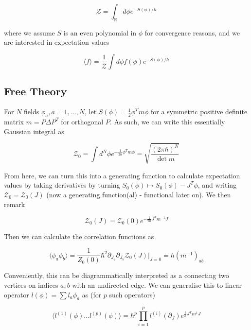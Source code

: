 \documentclass{article}
\theoremstyle{definition}
\begin{document}
\begin{equation}
  \mathcal{Z} = \int_\mathbb{R} d\phi e^{-S(\phi) / \hbar}
\end{equation}

where we assume $S$ is an even polynomial in $\phi$ for convergence reasons, and
we are interested in expectation values

\begin{equation}
  \langle f \rangle = \frac{1}{\mathcal{Z}} \int d\phi f(\phi) e^{-S(\phi) / \hbar}
\end{equation}

\subsection{Free Theory}

For $N$ fields $\phi_a, a = 1, \dots, N$, let $S(\phi) = \frac{1}{2} \phi^T m
\phi$ for a symmetric positive definite matrix $m = P\Delta P^T$ for orthogonal
$P$. As such, we can write this essentially Gaussian integral as

\begin{equation}
  \mathcal{Z}_0 = \int d^N \phi e^{-\frac{1}{2 \hbar} \phi^T m \phi} = \sqrt{\frac{(2\pi\hbar)^N}{\det m}}
\end{equation}

From here, we can turn this into a generating function to calculate expectation
values by taking derivatives by turning $S_0(\phi) \mapsto S_0(\phi) - J^T
\phi$, and writing $\mathcal{Z}_0 = \mathcal{Z}_0(J)$ (now a generating
function(al) - functional later on). We then remark

\begin{equation}
  \mathcal{Z}_0(J) = \mathcal{Z}_0(0) e^{-\frac{1}{2\hbar} J^T m^{-1} J}
\end{equation}

Then we can calculate the correlation functions as

\begin{equation}
  \langle \phi_a \phi_b \rangle = \frac{1}{Z_0(0)} \hbar^2 \partial_{J_a} \partial_{J_b} \mathcal{Z}_0(J) |_{J = 0}
  = h(m^{-1})_{ab}
\end{equation}

Conveniently, this can be diagrammatically interpreted as a connecting two
vertices on indices $a, b$ with an undirected edge. We can generalise this to
linear operator $l(\phi) = \sum l_a \phi_a$ as (for $p$ such operators)

\begin{equation}
  \langle l^{(1)}(\phi) \dots l^{(p)}(\phi) \rangle = \hbar^p \prod_{i = 1}^p l^{(i)}(\partial_J) e^{\frac{1}{\hbar} J^T m^1 J}
\end{equation}
\end{document}
